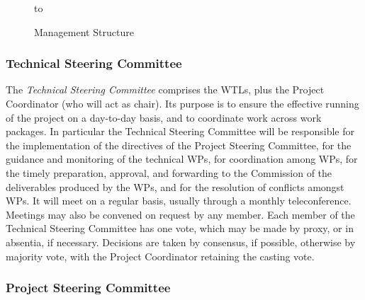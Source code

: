 \documentclass[a4paper,11pt]{article}
\begin{document}
\begin{figure}[t!]
\begin{center}
\centerline{\hspace{1in} 
\hbox to 
}
\end{center}
\vspace{-1.8in}
\caption{Management Structure}
\label{fig:management}
\end{figure}


\subsubsection*{Technical Steering Committee}
\vspace{-6pt}

The \emph{Technical Steering Committee} comprises the WTLs, plus the
Project Coordinator (who will act as chair).  Its purpose is to ensure
the effective running of the project on a day-to-day basis, and to
coordinate work across work packages.  In particular the Technical Steering
Committee will be
responsible for the implementation of the directives of the Project Steering
Committee, for the
guidance and monitoring of the technical WPs, for coordination among
WPs, for  the timely preparation, approval, and forwarding to the Commission
of the deliverables produced by the WPs, and for the resolution of conflicts
amongst WPs.  It will meet on a regular basis, usually through a monthly
teleconference.  Meetings may also be convened on request by any member.
Each member of the Technical Steering Committee has one vote,
which may be made by proxy, or in absentia, if necessary.  
Decisions are taken by consensus, if possible, otherwise by majority vote, 
with the
Project Coordinator retaining the casting vote.

\subsubsection*{Project Steering Committee}
\vspace{-6pt}
\end{document}
